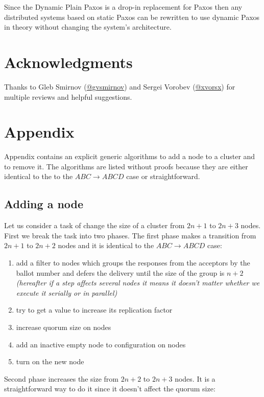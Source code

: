 \documentclass[12pt]{article}
\begin{document}
Since the Dynamic Plain Paxos is a drop-in replacement for Paxos then any distributed systems based on static Paxos can be rewritten to use dynamic Paxos in theory without changing the system's architecture.

\section{Acknowledgments}

Thanks to Gleb Smirnov (\href{https://twitter.com/gvsmirnov}{@gvsmirnov}) and Sergei Vorobev (\href{https://twitter.com/xvorsx}{@xvorsx}) for multiple reviews and helpful suggestions.

\newpage

\section{Appendix}

Appendix contains an explicit generic algorithms to add a node to a cluster and to remove it. The algorithms are listed without proofs because they are either identical to the to the $ABC \rightarrow ABCD$ case or straightforward.

\subsection{Adding a node}

Let us consider a task of change the size of a cluster from $2n+1$ to $2n+3$ nodes. First we break the task into two phases. The first phase makes a transition from $2n+1$ to $2n+2$ nodes and it is identical to the $ABC \rightarrow ABCD$ case:

\begin{enumerate}
\item add a filter to nodes which groups the responses from the acceptors by the ballot number and defers the delivery until the size of the group is $n+2$ {\it (hereafter if a step affects several nodes it means it doesn't matter whether we execute it serially or in parallel)}
\item try to get a value to increase its replication factor
\item increase quorum size on nodes
\item add an inactive empty node to configuration on nodes
\item turn on the new node
\end{enumerate}

{\noindent Second phase increases the size from $2n+2$ to $2n+3$ nodes. It is a straightforward way to do it since it doesn't affect the quorum size:}
\end{document}
